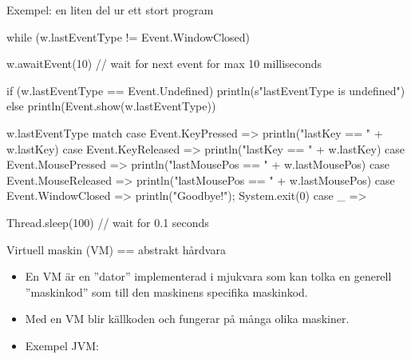 \documentclass{simpleslides}
\begin{document}
  
\begin{Slide}{Exempel: en liten del ur ett stort program}
\begin{Code}
  while (w.lastEventType != Event.WindowClosed) {
    w.awaitEvent(10)  // wait for next event for max 10 milliseconds

    if (w.lastEventType == Event.Undefined) 
      println(s"lastEventType is undefined")
    else 
      println(Event.show(w.lastEventType))

    w.lastEventType match {
      case Event.KeyPressed    => println("lastKey == " + w.lastKey)
      case Event.KeyReleased   => println("lastKey == " + w.lastKey)
      case Event.MousePressed  => println("lastMousePos == " + w.lastMousePos)
      case Event.MouseReleased => println("lastMousePos == " + w.lastMousePos)
      case Event.WindowClosed  => println("Goodbye!"); System.exit(0)
      case _ =>
    }

    Thread.sleep(100) // wait for 0.1 seconds
  }
\end{Code}
\end{Slide}


\begin{Slide}{Virtuell maskin (VM) == abstrakt hårdvara}
\begin{multicols}{2}
\begin{itemize}\small
\item En VM är en ''dator'' implementerad i mjukvara som kan tolka en generell ''maskinkod'' som  till den  maskinens specifika maskinkod.

\item Med en VM blir källkoden  och fungerar på många olika maskiner.

\item Exempel JVM: \\ 


\end{itemize}

\columnbreak %

\end{multicols}
\end{Slide}
\end{document}
